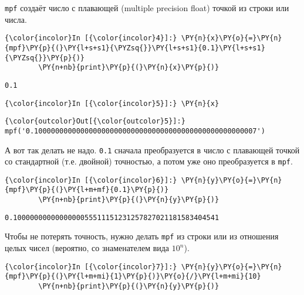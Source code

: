     \texttt{mpf} создаёт число с плавающей (multiple precision float) точкой
из строки или числа.

    \begin{Verbatim}[commandchars=\\\{\}]
{\color{incolor}In [{\color{incolor}4}]:} \PY{n}{x}\PY{o}{=}\PY{n}{mpf}\PY{p}{(}\PY{l+s+s1}{\PYZsq{}}\PY{l+s+s1}{0.1}\PY{l+s+s1}{\PYZsq{}}\PY{p}{)}
        \PY{n+nb}{print}\PY{p}{(}\PY{n}{x}\PY{p}{)}
\end{Verbatim}

    \begin{Verbatim}[commandchars=\\\{\}]
0.1

    \end{Verbatim}

    \begin{Verbatim}[commandchars=\\\{\}]
{\color{incolor}In [{\color{incolor}5}]:} \PY{n}{x}
\end{Verbatim}

            \begin{Verbatim}[commandchars=\\\{\}]
{\color{outcolor}Out[{\color{outcolor}5}]:} mpf('0.10000000000000000000000000000000000000000000000000007')
\end{Verbatim}
        
    А вот так делать не надо. \texttt{0.1} сначала преобразуется в число с
плавающей точкой со стандартной (т.е. двойной) точностью, а потом уже
оно преобразуется в \texttt{mpf}.

    \begin{Verbatim}[commandchars=\\\{\}]
{\color{incolor}In [{\color{incolor}6}]:} \PY{n}{y}\PY{o}{=}\PY{n}{mpf}\PY{p}{(}\PY{l+m+mf}{0.1}\PY{p}{)}
        \PY{n+nb}{print}\PY{p}{(}\PY{n}{y}\PY{p}{)}
\end{Verbatim}

    \begin{Verbatim}[commandchars=\\\{\}]
0.1000000000000000055511151231257827021181583404541

    \end{Verbatim}

    Чтобы не потерять точность, нужно делать \texttt{mpf} из строки или из
отношения целых чисел (вероятно, со знаменателем вида \(10^n\)).

    \begin{Verbatim}[commandchars=\\\{\}]
{\color{incolor}In [{\color{incolor}7}]:} \PY{n}{y}\PY{o}{=}\PY{n}{mpf}\PY{p}{(}\PY{l+m+mi}{1}\PY{p}{)}\PY{o}{/}\PY{l+m+mi}{10}
        \PY{n+nb}{print}\PY{p}{(}\PY{n}{y}\PY{p}{)}
\end{Verbatim}

